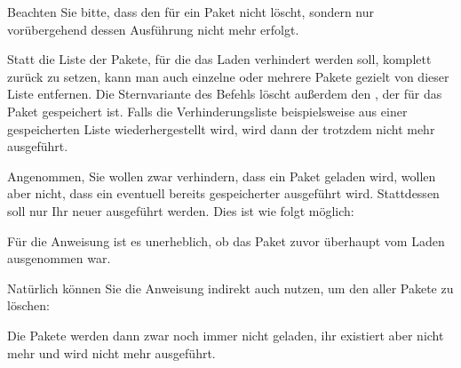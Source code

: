 Beachten Sie bitte, dass
 den  für ein
Paket nicht löscht, sondern nur vorübergehend dessen Ausführung nicht mehr
erfolgt.%
\EndIndexGroup


\begin{Declaration}
\end{Declaration}
Statt die Liste der Pakete, für die das
Laden verhindert werden soll, komplett zurück zu setzen, kann man auch
einzelne oder mehrere Pakete gezielt von dieser Liste entfernen. Die
Sternvariante des Befehls löscht außerdem den , der für
das Paket gespeichert ist. Falls die Verhinderungsliste beispielsweise aus
einer gespeicherten Liste wiederhergestellt wird, wird dann der
 trotzdem nicht mehr ausgeführt.%
%
\begin{Example}
  Angenommen, Sie wollen zwar verhindern, dass ein Paket 
  geladen wird, wollen aber nicht, dass ein eventuell bereits gespeicherter
   ausgeführt wird. Stattdessen soll nur Ihr neuer
   ausgeführt werden. Dies ist wie folgt möglich:
\begin{lstcode}
\end{lstcode}
  Für die Anweisung  ist es unerheblich,
  ob das Paket zuvor überhaupt vom Laden ausgenommen war.

  Natürlich können Sie die Anweisung indirekt auch nutzen, um den
   aller Pakete zu löschen:
\begin{lstcode}
  \StorePreventPackageFromLoading\TheWholePreventList
  \UnPreventPackageFromLoading*{\TheWholePreventList}
  \PreventPackageFromLoading{\TheWholePreventList}
\end{lstcode}
  Die Pakete werden dann zwar noch immer nicht geladen, ihr
   existiert aber nicht mehr und wird nicht mehr
  ausgeführt.%
\end{Example}%
\EndIndexGroup
%
\EndIndexGroup

